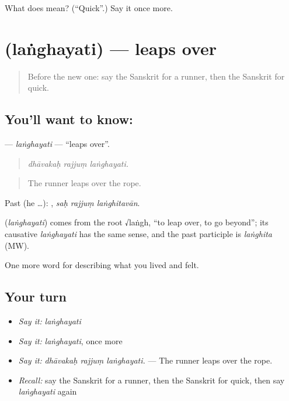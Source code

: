 \begin{tcolorbox}[breakable,colback=teal!4,colframe=teal!35!black,title={Before you move on}]
What does  mean? (\textquotedblleft{}Quick\textquotedblright{}.) Say it once more.
\end{tcolorbox}
\section[\texorpdfstring{\sk{लंघयति} (laṅghayati)}{लंघयति (laṅghayati)}]{ (laṅghayati) — leaps over}

\label{lesson:SA-C526-langhayati}



\begin{quote}
Before the new one: say the Sanskrit for a runner, then the Sanskrit for quick.
\end{quote}

\subsection*{You'll want to know: }
\textbf{} — \emph{laṅghayati} — \textquotedblleft{}leaps over\textquotedblright{}.

\begin{quote}
  
\end{quote}

\begin{quote}
\emph{dhāvakaḥ rajjuṃ laṅghayati.}
\end{quote}

\begin{quote}
The runner leaps over the rope.
\end{quote}

Past (he …):   , \emph{saḥ rajjuṃ laṅghitavān}.

\begin{cousinweb}
\textbf{} (\emph{laṅghayati}) comes from the root √laṅgh, \textquotedblleft{}to leap over, to go beyond\textquotedblright{}; its causative \emph{laṅghayati} has the same sense, and the past participle is \emph{laṅghita} (MW).
\end{cousinweb}

\begin{grammarlens}[title={What you've built}]
One more word for describing what you lived and felt.
\end{grammarlens}

\subsection*{Your turn}
\begin{itemize}
\raggedright
  \item \emph{Say it:} \emph{laṅghayati}
  \item \emph{Say it:} \emph{laṅghayati}, once more
  \item \emph{Say it:} \emph{dhāvakaḥ rajjuṃ laṅghayati.} — The runner leaps over the rope.
  \item \emph{Recall:} say the Sanskrit for a runner, then the Sanskrit for quick, then say \emph{laṅghayati} again
\end{itemize}


